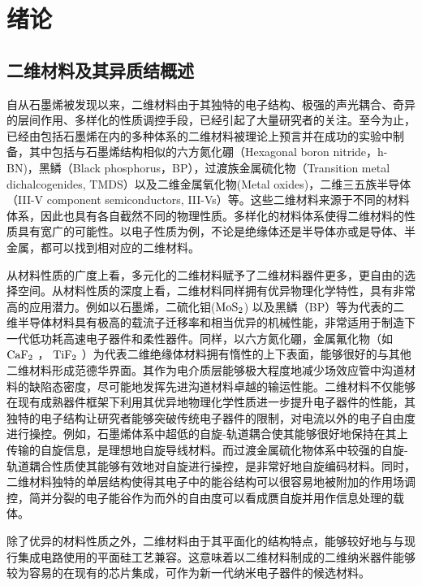 \chapter{绪\hspace{6pt}论}

\section{二维材料及其异质结概述}
自从石墨烯被发现以来，二维材料由于其独特的电子结构、极强的声光耦合、奇异的层间作用、多样化的性质调控手段，已经引起了大量研究者的关注。至今为止，已经由包括石墨烯在内的多种体系的二维材料被理论上预言并在成功的实验中制备，其中包括与石墨烯结构相似的六方氮化硼（Hexagonal boron nitride，h-BN)，黑鳞（Black phosphorus，BP），过渡族金属硫化物（Transition metal dichalcogenides, TMDS）以及二维金属氧化物(Metal oxides)，二维三五族半导体（III-V component semiconductors, III-Vs）等。这些二维材料来源于不同的材料体系，因此也具有各自截然不同的物理性质。多样化的材料体系使得二维材料的性质具有宽广的可能性。以电子性质为例，不论是绝缘体还是半导体亦或是导体、半金属，都可以找到相对应的二维材料。

从材料性质的广度上看，多元化的二维材料赋予了二维材料器件更多，更自由的选择空间。从材料性质的深度上看，二维材料同样拥有优异物理化学特性，具有非常高的应用潜力。例如以石墨烯，二硫化钼($ \rm{MoS_{2}} $) 以及黑鳞（BP）等为代表的二维半导体材料具有极高的载流子迁移率和相当优异的机械性能，非常适用于制造下一代低功耗高速电子器件和柔性器件。同样，以六方氮化硼，金属氟化物（如 $ \rm{CaF_{2}} $ ， $\rm{TiF_{2}}$ ）为代表二维绝缘体材料拥有惰性的上下表面，能够很好的与其他二维材料形成范德华界面。其作为电介质层能够极大程度地减少场效应管中沟道材料的缺陷态密度，尽可能地发挥先进沟道材料卓越的输运性能。二维材料不仅能够在现有成熟器件框架下利用其优异地物理化学性质进一步提升电子器件的性能，其独特的电子结构让研究者能够突破传统电子器件的限制，对电流以外的电子自由度进行操控。例如，石墨烯体系中超低的自旋-轨道耦合使其能够很好地保持在其上传输的自旋信息，是理想地自旋导线材料。而过渡金属硫化物体系中较强的自旋-轨道耦合性质使其能够有效地对自旋进行操控，是非常好地自旋编码材料。同时，二维材料独特的单层结构使得其电子中的能谷结构可以很容易地被附加的作用场调控，简并分裂的电子能谷作为而外的自由度可以看成赝自旋并用作信息处理的载体。

除了优异的材料性质之外，二维材料由于其平面化的结构特点，能够较好地与与现行集成电路使用的平面硅工艺兼容。这意味着以二维材料制成的二维纳米器件能够较为容易的在现有的芯片集成，可作为新一代纳米电子器件的候选材料。

